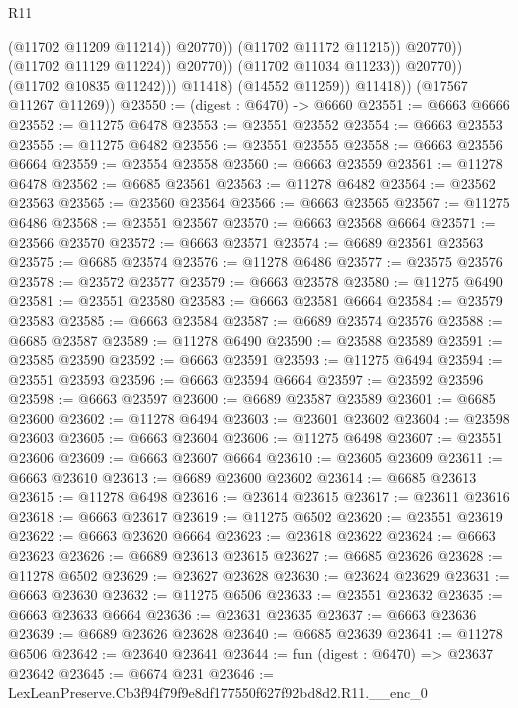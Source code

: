 \begin{lexlean}{R11}
\begin{coremodule}
                                          (@11702 @11209 @11214))
                                        @20770))
                                    (@11702 @11172 @11215))
                                  @20770))
                              (@11702 @11129 @11224))
                            @20770))
                        (@11702 @11034 @11233))
                      @20770))
                  (@11702 @10835 @11242)))
              @11418)
            (@14552 @11259))
          @11418))
      (@17567 @11267 @11269))
@23550 := (digest : @6470) -> @6660
@23551 := @6663 @6666
@23552 := @11275 @6478
@23553 := @23551 @23552
@23554 := @6663 @23553
@23555 := @11275 @6482
@23556 := @23551 @23555
@23558 := @6663 @23556 @6664
@23559 := @23554 @23558
@23560 := @6663 @23559
@23561 := @11278 @6478
@23562 := @6685 @23561
@23563 := @11278 @6482
@23564 := @23562 @23563
@23565 := @23560 @23564
@23566 := @6663 @23565
@23567 := @11275 @6486
@23568 := @23551 @23567
@23570 := @6663 @23568 @6664
@23571 := @23566 @23570
@23572 := @6663 @23571
@23574 := @6689 @23561 @23563
@23575 := @6685 @23574
@23576 := @11278 @6486
@23577 := @23575 @23576
@23578 := @23572 @23577
@23579 := @6663 @23578
@23580 := @11275 @6490
@23581 := @23551 @23580
@23583 := @6663 @23581 @6664
@23584 := @23579 @23583
@23585 := @6663 @23584
@23587 := @6689 @23574 @23576
@23588 := @6685 @23587
@23589 := @11278 @6490
@23590 := @23588 @23589
@23591 := @23585 @23590
@23592 := @6663 @23591
@23593 := @11275 @6494
@23594 := @23551 @23593
@23596 := @6663 @23594 @6664
@23597 := @23592 @23596
@23598 := @6663 @23597
@23600 := @6689 @23587 @23589
@23601 := @6685 @23600
@23602 := @11278 @6494
@23603 := @23601 @23602
@23604 := @23598 @23603
@23605 := @6663 @23604
@23606 := @11275 @6498
@23607 := @23551 @23606
@23609 := @6663 @23607 @6664
@23610 := @23605 @23609
@23611 := @6663 @23610
@23613 := @6689 @23600 @23602
@23614 := @6685 @23613
@23615 := @11278 @6498
@23616 := @23614 @23615
@23617 := @23611 @23616
@23618 := @6663 @23617
@23619 := @11275 @6502
@23620 := @23551 @23619
@23622 := @6663 @23620 @6664
@23623 := @23618 @23622
@23624 := @6663 @23623
@23626 := @6689 @23613 @23615
@23627 := @6685 @23626
@23628 := @11278 @6502
@23629 := @23627 @23628
@23630 := @23624 @23629
@23631 := @6663 @23630
@23632 := @11275 @6506
@23633 := @23551 @23632
@23635 := @6663 @23633 @6664
@23636 := @23631 @23635
@23637 := @6663 @23636
@23639 := @6689 @23626 @23628
@23640 := @6685 @23639
@23641 := @11278 @6506
@23642 := @23640 @23641
@23644 := fun (digest : @6470) => @23637 @23642
@23645 := @6674 @231
@23646 := LexLeanPreserve.Cb3f94f79f9e8df177550f627f92bd8d2.R11.__enc_0

\end{coremodule}
\end{lexlean}
